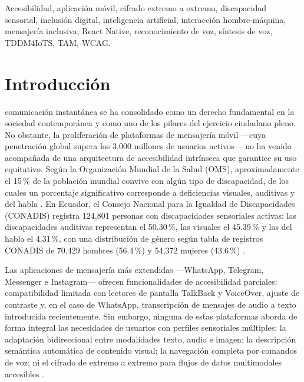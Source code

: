 \documentclass[journal]{IEEEtran}
\begin{document}
	\begin{IEEEkeywords}
		Accesibilidad, aplicaci\'on m\'ovil, cifrado extremo a extremo, discapacidad sensorial, inclusi\'on digital, inteligencia artificial, interacci\'on hombre-m\'aquina, mensajer\'ia inclusiva, React Native, reconocimiento de voz, s\'intesis de voz, TDDM4IoTS, TAM, WCAG.
	\end{IEEEkeywords}
	
	\section{Introducci\'on}
	 comunicaci\'on instant\'anea se ha consolidado como un derecho fundamental en la sociedad contempor\'anea y como uno de los pilares del ejercicio ciudadano pleno. No obstante, la proliferaci\'on de plataformas de mensajer\'ia m\'ovil ---cuya penetraci\'on global supera los 3{,}000 millones de usuarios activos--- no ha venido acompa\~nada de una arquitectura de accesibilidad intr\'inseca que garantice su uso equitativo. Seg\'un la Organizaci\'on Mundial de la Salud (OMS), aproximadamente el 15\,\% de la poblaci\'on mundial convive con alg\'un tipo de discapacidad, de los cuales un porcentaje significativo corresponde a deficiencias visuales, auditivas y del habla \cite{who2011}. En Ecuador, el Consejo Nacional para la Igualdad de Discapacidades (CONADIS) registra 124{,}801 personas con discapacidades sensoriales activas: las discapacidades auditivas representan el 50.30\,\%, las visuales el 45.39\,\% y las del habla el 4.31\,\%, con una distribuci\'on de g\'enero seg\'un tabla de registros CONADIS de 70{,}429 hombres (56.4\,\%) y 54{,}372 mujeres (43.6\,\%) \cite{conadis2024}.
	
	Las aplicaciones de mensajer\'ia m\'as extendidas ---WhatsApp, Telegram, Messenger e Instagram--- ofrecen funcionalidades de accesibilidad parciales: compatibilidad limitada con lectores de pantalla TalkBack y VoiceOver, ajuste de contraste y, en el caso de WhatsApp, transcripci\'on de mensajes de audio a texto introducida recientemente. Sin embargo, ninguna de estas plataformas aborda de forma integral las necesidades de usuarios con perfiles sensoriales m\'ultiples: la adaptaci\'on bidireccional entre modalidades texto, audio e imagen; la descripci\'on sem\'antica autom\'atica de contenido visual; la navegaci\'on completa por comandos de voz; ni el cifrado de extremo a extremo para flujos de datos multimodales accesibles \cite{bercaru2024, weichbroth2020}.
	
\end{document}
